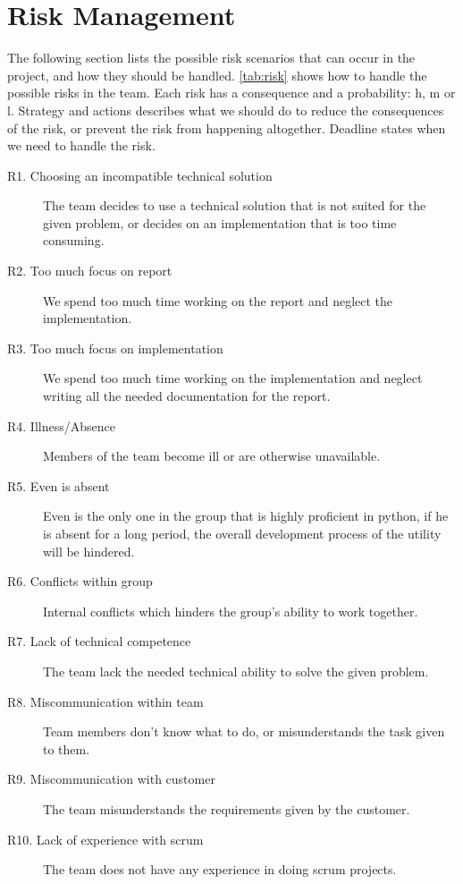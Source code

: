 \section{Risk Management}
The following section lists the possible risk scenarios that can occur in the project, and how they should be handled. \autoref{tab:risk} shows how to handle the possible risks in the team. Each risk has a consequence and a probability:  \Gls{h}, \Gls{m} or \Gls{l}.
Strategy and actions describes what we should do to reduce the consequences of the risk, or prevent the risk from happening altogether. Deadline states when we need to handle the risk.
\begin{description}
\item[R1. Choosing an incompatible technical solution]  The team decides to use a technical solution that is not suited for the given problem, or decides on an implementation that is too time consuming.
\item[R2. Too much focus on report]   We spend too much time working on the report and neglect the implementation. 
\item[R3. Too much focus on implementation]  We spend too much time working on the implementation and neglect writing all the needed documentation for the report.
\item[R4. Illness/Absence]  Members of the team become ill or are otherwise unavailable. 
\item[R5. Even is absent]  Even is the only one in the group that is highly proficient in \Gls{python}, if he is absent for a long period, the overall development process of the utility will be hindered.
\item[R6. Conflicts within group]   Internal conflicts which hinders the group's ability to work together. 
\item[R7. Lack of technical competence]  The team lack the needed technical ability to solve the given problem. 
\item[R8. Miscommunication within team]  Team members don’t know what to do, or misunderstands the task given to them. 
\item[R9. Miscommunication with customer]  The team misunderstands the requirements given by the customer. 
\item[R10. Lack of experience with \Gls{scrum}]  The team does not have any experience in doing \Gls{scrum} projects.
\end{description}

